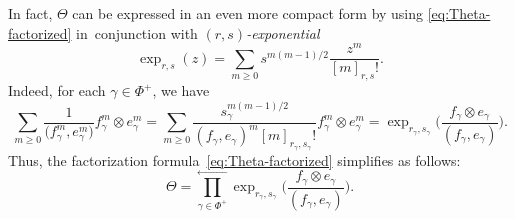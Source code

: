 \documentclass[pdftex]{sigma}
\numberwithin{equation}{section}
\begin{document}
\begin{Remark}%
In fact, $\Theta$ can be expressed in an even more compact form by using \eqref{eq:Theta-factorized} in~conjunction with \textit{$(r,s)$-exponential}
\begin{displaymath}
 \exp_{r,s}(z) = \sum_{m \ge 0}s^{m(m-1)/2} \frac{z^{m}}{[m]_{r,s}!}.
\end{displaymath}
Indeed, for each $\gamma \in \Phi^{+}$, we have
\begin{equation}\label{eq:local-exp}
 \sum_{m \ge 0} \frac{1}{\bigl(f_{\gamma}^{m},e_{\gamma}^{m}\bigr)}f_{\gamma}^{m} \otimes e_{\gamma}^{m} =
 \sum_{m \ge 0}\frac{s^{m(m - 1)/2}_\gamma}{(f_{\gamma},e_{\gamma})^{m}[m]_{r_{\gamma},s_{\gamma}}!}f_{\gamma}^{m} \otimes e_{\gamma}^{m}
 = \exp_{r_{\gamma},s_{\gamma}} \biggl(\frac{f_{\gamma} \otimes e_{\gamma}}{(f_{\gamma},e_{\gamma})}\biggr).
\end{equation}
Thus, the factorization formula~\eqref{eq:Theta-factorized} simplifies as follows:
\begin{displaymath}%
 \Theta = \overset{\longleftarrow}{\underset{\gamma \in \Phi^{+}}{\prod}}
 \exp_{r_{\gamma},s_{\gamma}}\biggl(\frac{f_{\gamma} \otimes e_{\gamma}}{(f_{\gamma},e_{\gamma})}\biggr).
\end{displaymath}
\end{Remark}
\end{document}
